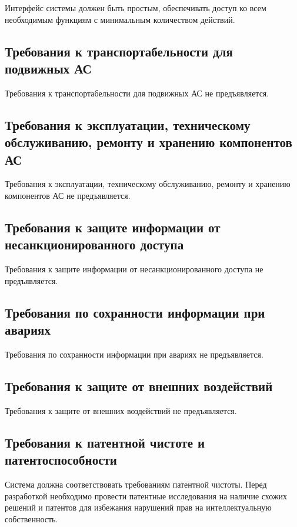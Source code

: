 Интерфейс системы должен быть простым,
обеспечивать доступ ко всем необходимым функциям
с минимальным количеством действий.

\subsection{Требования к транспортабельности для подвижных АС}

Требования к транспортабельности для подвижных АС
не предъявляется.

\subsection{Требования к эксплуатации, техническому обслуживанию,
	ремонту и хранению компонентов АС}

Требования к эксплуатации, техническому обслуживанию,
ремонту и хранению компонентов АС не предъявляется.

\subsection{Требования к защите информации от несанкционированного доступа}

Требования к защите информации от несанкционированного доступа
не предъявляется.

\subsection{Требования по сохранности информации при авариях}

Требования по сохранности информации при авариях не предъявляется.

\subsection{Требования к защите от внешних воздействий}

Требования к защите от внешних воздействий не предъявляется.

\subsection{Требования к патентной чистоте и патентоспособности}

Система должна соответствовать требованиям патентной чистоты.
Перед разработкой необходимо провести патентные исследования
на наличие схожих решений и патентов
для избежания нарушений прав на интеллектуальную собственность.

